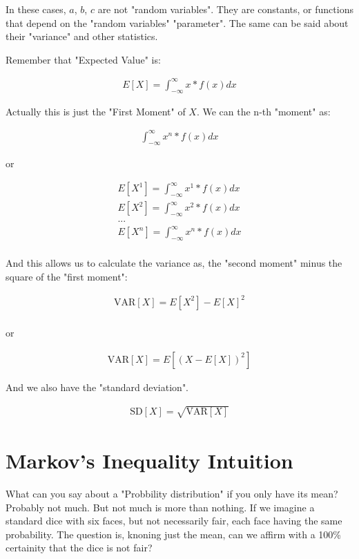 \documentclass[10pt,a4paper]{book}
\begin{document}
In these cases, $a$, $b$, $c$ are not "random variables". They are constants, or functions that depend on the "random variables" "parameter". The same can be said about their "variance" and other statistics.

Remember that "Expected Value" is:

\begin{align}
	E[X] = \int_{-\infty}^{\infty}{x*f(x)dx}
\end{align}

Actually this is just the "First Moment" of $X$. We can the n-th "moment" as:

\begin{align}
	\int_{-\infty}^{\infty}{x^n*f(x)dx}
\end{align}

or

\begin{align*}
	E[X^1] = \int_{-\infty}^{\infty}{x^1*f(x)dx}\\
	E[X^2] = \int_{-\infty}^{\infty}{x^2*f(x)dx}\\
	...\\
	E[X^n] = \int_{-\infty}^{\infty}{x^n*f(x)dx}\\
\end{align*}

And this allows us to calculate the variance as, the "second moment" minus the square of the "first moment":

\begin{align}
	\text{VAR}[X] = E[X^2] - E[X]^2\\
\end{align}

or 

\begin{align}
\text{VAR}[X] = E[(X-E[X])^2]
\end{align}

And we also have the "standard deviation".

\begin{align}
	\text{SD}[X] = \sqrt{\text{VAR}[X]}
\end{align}

\section{Markov's Inequality Intuition}
	
What can you say about a "Probbility distribution" if you only have its mean? Probably not much. But not much is more than nothing. If we imagine a standard dice with six faces, but not necessarily fair, each face having the same probability. The question is, knoning just the mean, can we affirm with a 100\% certainity that the dice is not fair?
\end{document}
